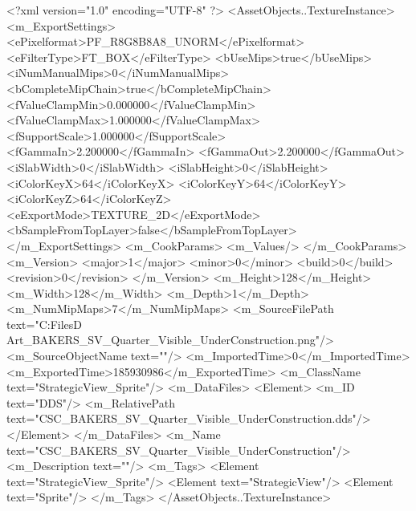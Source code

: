 <?xml version="1.0" encoding="UTF-8" ?>
<AssetObjects..TextureInstance>
	<m_ExportSettings>
		<ePixelformat>PF_R8G8B8A8_UNORM</ePixelformat>
		<eFilterType>FT_BOX</eFilterType>
		<bUseMips>true</bUseMips>
		<iNumManualMips>0</iNumManualMips>
		<bCompleteMipChain>true</bCompleteMipChain>
		<fValueClampMin>0.000000</fValueClampMin>
		<fValueClampMax>1.000000</fValueClampMax>
		<fSupportScale>1.000000</fSupportScale>
		<fGammaIn>2.200000</fGammaIn>
		<fGammaOut>2.200000</fGammaOut>
		<iSlabWidth>0</iSlabWidth>
		<iSlabHeight>0</iSlabHeight>
		<iColorKeyX>64</iColorKeyX>
		<iColorKeyY>64</iColorKeyY>
		<iColorKeyZ>64</iColorKeyZ>
		<eExportMode>TEXTURE_2D</eExportMode>
		<bSampleFromTopLayer>false</bSampleFromTopLayer>
	</m_ExportSettings>
	<m_CookParams>
		<m_Values/>
	</m_CookParams>
	<m_Version>
		<major>1</major>
		<minor>0</minor>
		<build>0</build>
		<revision>0</revision>
	</m_Version>
	<m_Height>128</m_Height>
	<m_Width>128</m_Width>
	<m_Depth>1</m_Depth>
	<m_NumMipMaps>7</m_NumMipMaps>
	<m_SourceFilePath text="C:\Users\Shadow\Desktop\Working Files\2D Art\Quarters\Bakers\StrategicView\CSC_BAKERS_SV_Quarter_Visible_UnderConstruction.png"/>
	<m_SourceObjectName text=""/>
	<m_ImportedTime>0</m_ImportedTime>
	<m_ExportedTime>185930986</m_ExportedTime>
	<m_ClassName text="StrategicView_Sprite"/>
	<m_DataFiles>
		<Element>
			<m_ID text="DDS"/>
			<m_RelativePath text="CSC_BAKERS_SV_Quarter_Visible_UnderConstruction.dds"/>
		</Element>
	</m_DataFiles>
	<m_Name text="CSC_BAKERS_SV_Quarter_Visible_UnderConstruction"/>
	<m_Description text=""/>
	<m_Tags>
		<Element text="StrategicView_Sprite"/>
		<Element text="StrategicView"/>
		<Element text="Sprite"/>
	</m_Tags>
</AssetObjects..TextureInstance>

